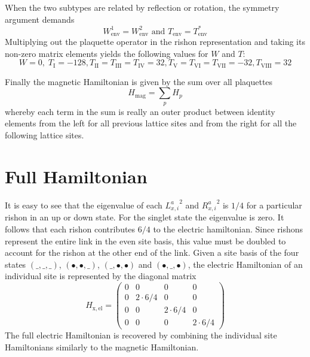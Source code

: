 \documentclass[a4paper,oneside, 11pt,english,listof=totoc,bibliography=totoc]{scrbook}
\begin{document}
When the two subtypes are related by reflection or rotation, the symmetry argument demands
$$W^1_\mathrm{env}=W^2_\mathrm{env}\text{ and }T_\mathrm{env}=T^*_\mathrm{env}$$
Multiplying out the plaquette operator in the rishon representation and taking its non-zero matrix elements yields the following values for $W$ and $T$:
\begin{equation}\label{eq:WT-plaquette}
    W=0,\;T_\mathrm{I}=-128,T_\mathrm{II}=T_\mathrm{III}=T_\mathrm{IV}=32,T_\mathrm{V}=T_\mathrm{VI}=T_\mathrm{VII}=-32,T_\mathrm{VIII}=32
\end{equation}

Finally the magnetic Hamiltonian is given by the sum over all plaquettes
\begin{equation}\label{eq:mag-hamiltonian}
    H_\mathrm{mag}=\sum_p H_p
\end{equation}
whereby each term in the sum is really an outer product between identity elements from the left for all previous lattice sites and from the right for all the following lattice sites.

\section{Full Hamiltonian}
It is easy to see that the eigenvalue of each ${L^a_{x,i}}^2$ and ${R^a_{x,i}}^2$ is $1/4$ for a particular rishon in an up or down state. For the singlet state the eigenvalue is zero. It follows that each rishon contributes $6/4$ to the electric hamiltonian. Since rishons represent the entire link in the even site basis, this value must be doubled to account for the rishon at the other end of the link. Given a site basis of the four states $(\_,\_,\_)$, $(\bullet,\bullet,\_)$, $(\_,\bullet,\bullet)$ and $(\bullet,\_,\bullet)$, the electric Hamiltonian of an individual site is represented by the diagonal matrix
\begin{equation}\label{eq:el-hamiltonian}
    H_\mathrm{x,el}=\begin{pmatrix}
        0 & 0 & 0 & 0 \\
        0 & 2\cdot 6/4 & 0 & 0 \\
        0 & 0 & 2\cdot 6/4 & 0 \\
        0 & 0 & 0 & 2\cdot 6/4
    \end{pmatrix}
\end{equation}
The full electric Hamiltonian is recovered by combining the individual site Hamiltonians similarly to the magnetic Hamiltonian.
\end{document}
